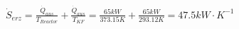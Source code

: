 \( \dot{S}_{erz} = \frac{\dot{Q}_{aus}}{T_{Reactor}} + \frac{\dot{Q}_{aus}}{T_{KF}} = \frac{65kW}{373.15K} + \frac{65kW}{293.12K} = 47.5kW \cdot K^{-1} \)